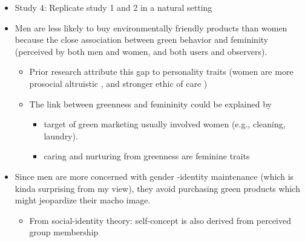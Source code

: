 \documentclass[
]{book}
\providecommand{\tightlist}{%
  \setlength{\itemsep}{0pt}\setlength{\parskip}{0pt}}
\begin{document}
\begin{itemize}
  \begin{itemize}
  \tightlist
  \item
    Valence affects perceived typicality , but experience with a firm did not influence typicality (cant find support for H3)
  \end{itemize}
\item
  Study 4: Replicate study 1 and 2 in a natural setting
\end{itemize}

\citep{brough2016}

\begin{itemize}
\item
  Men are less likely to buy environmentally friendly products than women because the close association between green behavior and femininity (perceived by both men and women, and both users and observers).

  \begin{itemize}
  \item
    Prior research attribute this gap to personality traits (women are more prosocial altruistic \citep{lee1999}, and stronger ethic of care \citep{zelezny2000})
  \item
    The link between greenness and femininity could be explained by

    \begin{itemize}
    \item
      target of green marketing usually involved women (e.g., cleaning, laundry).
    \item
      caring and nurturing from greenness are feminine traits
    \end{itemize}
  \end{itemize}
\item
  Since men are more concerned with gender -identity maintenance (which is kinda surprising from my view), they avoid purchasing green products which might jeopardize their macho image.

  \begin{itemize}
  \tightlist
  \item
    From social-identity theory: self-concept is also derived from perceived group membership \citep{turner1986}
  \end{itemize}
\end{itemize}

\citep{wang2016}
\end{document}
